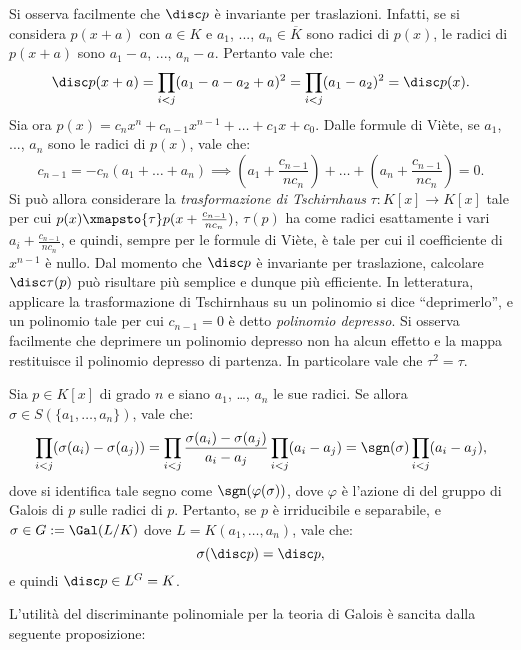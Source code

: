 \documentclass[12pt]{scrartcl}
\begin{document}
	\begin{remark}
		Si osserva facilmente che $\disc p$ è invariante per traslazioni. Infatti,
		se si considera $p(x+a)$ con $a \in K$ e $a_1$, ..., $a_n \in \overline{K}$ sono
		radici di $p(x)$, le radici di $p(x+a)$ sono $a_1 - a$, ..., $a_n - a$. Pertanto
		vale che:
		\[ \disc p(x+a) = \prod_{i<j} (a_1 - a - a_2 + a)^2 = \prod_{i<j} (a_1 - a_2)^2 = \disc p(x). \]
		Sia ora $p(x) = c_n x^n + c_{n-1} x^{n-1} + \ldots + c_1 x + c_0$. Dalle formule
		di Viète, se $a_1$, ..., $a_n$ sono le radici di $p(x)$, vale che:
		\[ c_{n-1} = -c_n (a_1 + \ldots + a_n) \implies \left(a_1 + \frac{c_{n-1}}{n c_n}\right) + \ldots +  \left(a_n + \frac{c_{n-1}}{n c_n}\right) = 0. \]
		Si può allora considerare la \textit{trasformazione di Tschirnhaus} $\tau : K[x] \to K[x]$ tale per cui $p(x) \xmapsto{\tau} p(x +  \frac{c_{n-1}}{n c_n})$,
		$\tau(p)$ ha come radici esattamente i vari $a_i + \frac{c_{n-1}}{n c_n}$, e
		quindi, sempre per le formule di Viète, è tale per cui il coefficiente di $x^{n-1}$
		è nullo. Dal momento che $\disc p$ è invariante per traslazione,
		calcolare $\disc \tau(p)$ può risultare più semplice e dunque più efficiente.
		In letteratura, applicare la trasformazione di Tschirnhaus su un polinomio
		si dice ``deprimerlo'', e un polinomio tale per cui $c_{n-1} = 0$ è
		detto \textit{polinomio depresso}. Si osserva facilmente che deprimere un
		polinomio depresso non ha alcun effetto e la mappa restituisce il polinomio
		depresso di partenza. In particolare vale che $\tau^2 = \tau$.
	\end{remark}

	\begin{remark}
		Sia $p \in K[x]$ di grado $n$ e siano $a_1$, \ldots, $a_n$ le sue radici.
		Se allora $\sigma \in S(\{a_1, \ldots, a_n\})$, vale che:
		\[ \prod_{i < j} (\sigma(a_i) - \sigma(a_j)) = \prod_{i < j} \frac{\sigma(a_i) - \sigma(a_j)}{a_i - a_j} \prod_{i < j} (a_i - a_j) = \sgn(\sigma) \prod_{i < j} (a_i - a_j),  \]
		dove si identifica tale segno come $\sgn(\varphi(\sigma))$, dove
		$\varphi$ è l'azione di del gruppo di Galois di $p$ sulle radici di $p$.
		Pertanto, se $p$ è irriducibile e separabile, e $\sigma \in G := \Gal(L / K)$ dove
		$L = K(a_1, \ldots, a_n)$, vale che:
		\[ \sigma(\disc p) = \disc p, \]
		e quindi $\disc p \in L^G = K$.
	\end{remark}
	
	L'utilità del discriminante polinomiale per la teoria di Galois è sancita dalla
	seguente proposizione:
	
\end{document}
